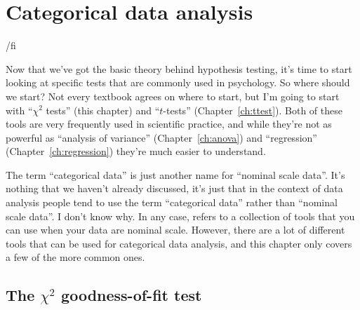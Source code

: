 
\chapter{Categorical data analysis\label{ch:chisquare}}






\iffalse %


/fi %







Now that we've got the basic theory behind hypothesis testing, it's time to start looking at specific tests that are commonly used in psychology. So where should we start? Not every textbook agrees on where to start, but I'm going to start with ``$\chi^2$ tests'' (this chapter) and ``$t$-tests'' (Chapter~\ref{ch:ttest}). Both of these tools are very frequently used in scientific practice, and while they're not as powerful as ``analysis of variance'' (Chapter~\ref{ch:anova}) and ``regression'' (Chapter~\ref{ch:regression}) they're much easier to understand.

The term ``categorical data'' is just another name for ``nominal scale data''. It's nothing that we haven't already discussed, it's just that in the context of data analysis people tend to use the term ``categorical data'' rather than ``nominal scale data''. I don't know why. In any case,  refers to a collection of tools that you can use when your data are nominal scale. However, there are a lot of different tools that can be used for categorical data analysis, and this chapter only covers a few of the more common ones.


\section{The $\chi^2$ goodness-of-fit test~\label{sec:goftest}}

